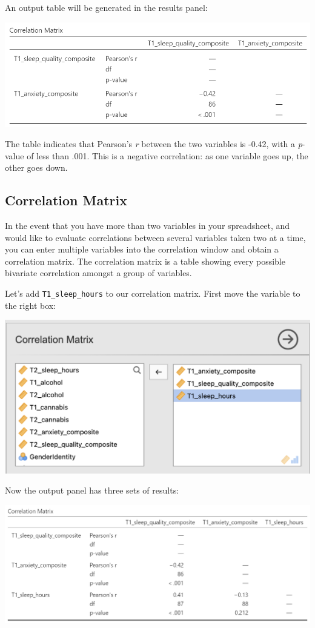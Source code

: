 \documentclass[
]{book}
\begin{document}
An output table will be generated in the results panel:

\includegraphics{img/CorrelationMatrixVersionB.png}

The table indicates that Pearson's \emph{r} between the two variables is -0.42, with a \emph{p}-value of less than .001. This is a negative correlation: as one variable goes up, the other goes down.

\hypertarget{correlation-matrix-1}{%
\subsection{Correlation Matrix}\label{correlation-matrix-1}}

In the event that you have more than two variables in your spreadsheet, and would like to evaluate correlations between several variables taken two at a time, you can enter multiple variables into the correlation window and obtain a correlation matrix. The correlation matrix is a table showing every possible bivariate correlation amongst a group of variables.

Let's add \texttt{T1\_sleep\_hours} to our correlation matrix. First move the variable to the right box:

\includegraphics{img/corvars2.png}

Now the output panel has three sets of results:

\includegraphics{img/CorrelationMatrix2VersionB.png}
\end{document}
